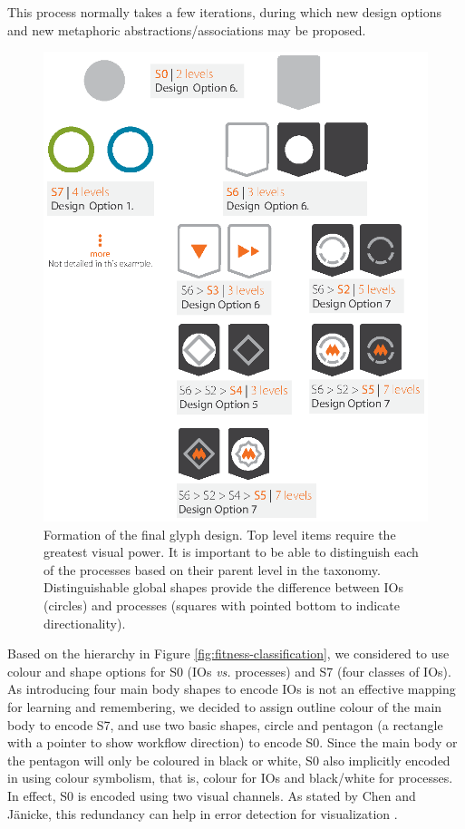 This process normally takes a few iterations, during which new design options and new metaphoric abstractions/associations may be proposed.

\begin{figure}[t!]
\centering
\includegraphics[width=.6\textwidth]{images/glyph-taxonomy/glyph-design-selection.eps}
\caption{Formation of the final glyph design. Top level items require the greatest visual power.
It is important to be able to distinguish each of the processes based on their parent level in the taxonomy.
Distinguishable global shapes provide the difference between IOs (circles) and processes (squares with pointed bottom to indicate directionality).}
\label{fig:glyph-design-selection}
\vspace{-10pt}
\end{figure}

Based on the hierarchy in Figure \ref{fig:fitness-classification}, we considered to use colour and shape options for S0 (IOs \emph{vs.} processes) and S7 (four classes of IOs).
As introducing four main body shapes to encode IOs is not an effective mapping for learning and remembering, we decided to assign outline colour of the main body to encode S7, and use two basic shapes, circle and pentagon (a rectangle with a pointer to show workflow direction) to encode S0.
Since the main body or the pentagon will only be coloured in black or white, S0 also implicitly encoded in using colour symbolism, that is, colour for IOs and black/white for processes.
In effect, S0 is encoded using two visual channels.
As stated by Chen and J\"{a}nicke, this redundancy can help in error detection for visualization \cite{Chen10}.

